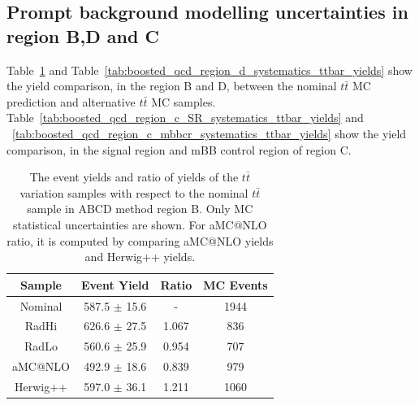 \subsection{Prompt background modelling uncertainties in region B,D and C}
\label{app:boosted_qcd_region_mcmodelling_unc}
%
%
Table~\ref{tab:boosted_qcd_region_b_systematics_ttbar_yields} and Table~\ref{tab:boosted_qcd_region_d_systematics_ttbar_yields} 
show the yield comparison, in the region B and D, between the nominal $t\bar{t}$ MC prediction
and alternative $t\bar{t}$ MC samples. Table~\ref{tab:boosted_qcd_region_c_SR_systematics_ttbar_yields}
and ~\ref{tab:boosted_qcd_region_c_mbbcr_systematics_ttbar_yields} show the yield comparison, in the signal region and mBB control 
region of region C.
%
\begin{table}[htbp!]
\begin{center}
\begin{tabular}{c|c|c||c}
Sample     & Event Yield       & Ratio  & MC Events \\ 
\hline
Nominal    & 587.5 $\pm$ 15.6  & -      & 1944 \\
RadHi      & 626.6 $\pm$ 27.5  & 1.067  & 836  \\
RadLo      & 560.6 $\pm$ 25.9  & 0.954  & 707  \\
aMC@NLO    & 492.9 $\pm$ 18.6  & 0.839  & 979  \\
Herwig++   & 597.0 $\pm$ 36.1  & 1.211  & 1060 \\
\end{tabular}
\end{center}
\caption{The event yields and ratio of yields of the $t\bar{t}$ variation samples
with respect to the nominal $t\bar{t}$ sample in ABCD method region B.
Only MC statistical uncertainties are shown. For aMC@NLO ratio, it is 
computed by comparing aMC@NLO yields and Herwig++ yields.} 
\label{tab:boosted_qcd_region_b_systematics_ttbar_yields}
\end{table}
%
